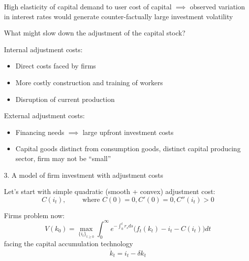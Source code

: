 \documentclass[11pt, aspectratio=169]{beamer}
\newenvironment{witemize}{\itemize\addtolength{\itemsep}{10pt}}{\enditemize}
\begin{document}
\begin{frame}{}
\begin{witemize}
\item High elasticity of capital demand to user cost of capital $\implies$ observed variation in interest rates would generate counter-factually large investment volatility

\item What might slow down the adjustment of the capital stock?

\item Internal adjustment costs:
\begin{itemize}
	\item Direct costs faced by firms 
	\item More costly construction and training of workers
	\item Disruption of current production
\end{itemize}

\item External adjustment costs:
\begin{itemize}
	\item Financing needs $\implies$ large upfront investment costs
	\item Capital goods distinct from consumption goods, distinct capital producing sector, firm may not be ``small''
\end{itemize}

\end{witemize}
\end{frame}


\begin{frame}{3. A model of firm investment with adjustment costs} 
\begin{witemize}
\item Let's start with simple quadratic (smooth + convex) adjustment cost:
\begin{equation*}
	C(i_t) , \quad \quad \text{ where } C(0) = 0, C'(0) = 0, C''(i_t) > 0
\end{equation*}


\item Firms problem now: 
\begin{equation*}
	V(k_0) = \max_{ \{i_t\}_{t \geq 0} } \int_0^\infty e^{- \int_0^t r_s ds} \bigg( f_t(k_t) - i_t - C(i_t) \bigg) dt
\end{equation*}
facing the capital accumulation technology 
\begin{equation*}
	\dot k_t = i_t - \delta k_t
\end{equation*}

\end{witemize}
\end{frame}
\end{document}
